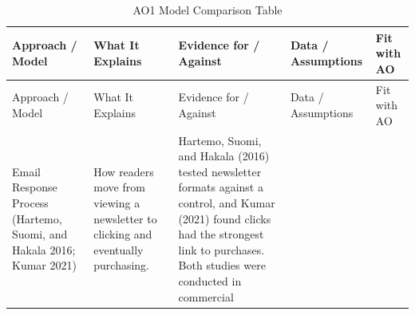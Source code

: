 \documentclass[
  12pt,
  letterpaper,
  DIV=11,
  numbers=noendperiod]{scrartcl}
\begin{document}
\begin{longtable}[]{@{}
  >{\raggedright\arraybackslash}p{}
  >{\raggedright\arraybackslash}p{}
  >{\raggedright\arraybackslash}p{}
  >{\raggedright\arraybackslash}p{}
  >{\raggedright\arraybackslash}p{}@{}}
\caption{AO1 Model Comparison Table}\tabularnewline
\toprule\noalign{}
\begin{minipage}[b]{\linewidth}\raggedright
Approach / Model
\end{minipage} & \begin{minipage}[b]{\linewidth}\raggedright
What It Explains
\end{minipage} & \begin{minipage}[b]{\linewidth}\raggedright
Evidence for / Against
\end{minipage} & \begin{minipage}[b]{\linewidth}\raggedright
Data / Assumptions
\end{minipage} & \begin{minipage}[b]{\linewidth}\raggedright
Fit with AO
\end{minipage} \\
\midrule\noalign{}
\endfirsthead
\toprule\noalign{}
\begin{minipage}[b]{\linewidth}\raggedright
Approach / Model
\end{minipage} & \begin{minipage}[b]{\linewidth}\raggedright
What It Explains
\end{minipage} & \begin{minipage}[b]{\linewidth}\raggedright
Evidence for / Against
\end{minipage} & \begin{minipage}[b]{\linewidth}\raggedright
Data / Assumptions
\end{minipage} & \begin{minipage}[b]{\linewidth}\raggedright
Fit with AO
\end{minipage} \\
\midrule\noalign{}
\endhead
\bottomrule\noalign{}
\endlastfoot
Email Response Process (Hartemo, Suomi, and Hakala 2016; Kumar 2021) &
How readers move from viewing a newsletter to clicking and eventually
purchasing. & Hartemo, Suomi, and Hakala (2016) tested newsletter
formats against a control, and Kumar (2021) found clicks had the
strongest link to purchases. Both studies were conducted in commercial

\end{longtable}
\end{document}
